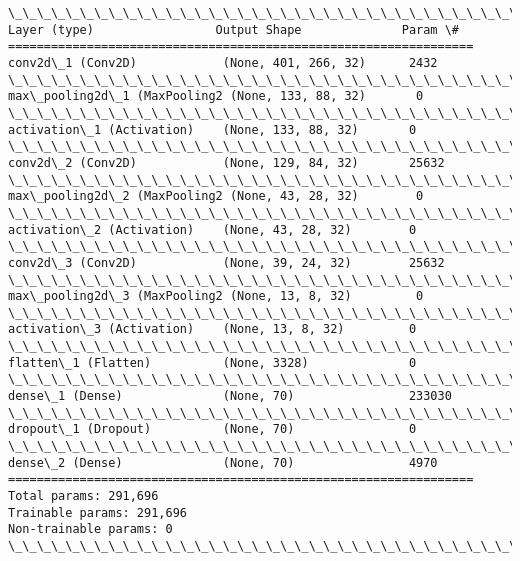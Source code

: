 \documentclass[11pt]{article}
\begin{document}
    \begin{Verbatim}[commandchars=\\\{\}]
\_\_\_\_\_\_\_\_\_\_\_\_\_\_\_\_\_\_\_\_\_\_\_\_\_\_\_\_\_\_\_\_\_\_\_\_\_\_\_\_\_\_\_\_\_\_\_\_\_\_\_\_\_\_\_\_\_\_\_\_\_\_\_\_\_
Layer (type)                 Output Shape              Param \#   
=================================================================
conv2d\_1 (Conv2D)            (None, 401, 266, 32)      2432      
\_\_\_\_\_\_\_\_\_\_\_\_\_\_\_\_\_\_\_\_\_\_\_\_\_\_\_\_\_\_\_\_\_\_\_\_\_\_\_\_\_\_\_\_\_\_\_\_\_\_\_\_\_\_\_\_\_\_\_\_\_\_\_\_\_
max\_pooling2d\_1 (MaxPooling2 (None, 133, 88, 32)       0         
\_\_\_\_\_\_\_\_\_\_\_\_\_\_\_\_\_\_\_\_\_\_\_\_\_\_\_\_\_\_\_\_\_\_\_\_\_\_\_\_\_\_\_\_\_\_\_\_\_\_\_\_\_\_\_\_\_\_\_\_\_\_\_\_\_
activation\_1 (Activation)    (None, 133, 88, 32)       0         
\_\_\_\_\_\_\_\_\_\_\_\_\_\_\_\_\_\_\_\_\_\_\_\_\_\_\_\_\_\_\_\_\_\_\_\_\_\_\_\_\_\_\_\_\_\_\_\_\_\_\_\_\_\_\_\_\_\_\_\_\_\_\_\_\_
conv2d\_2 (Conv2D)            (None, 129, 84, 32)       25632     
\_\_\_\_\_\_\_\_\_\_\_\_\_\_\_\_\_\_\_\_\_\_\_\_\_\_\_\_\_\_\_\_\_\_\_\_\_\_\_\_\_\_\_\_\_\_\_\_\_\_\_\_\_\_\_\_\_\_\_\_\_\_\_\_\_
max\_pooling2d\_2 (MaxPooling2 (None, 43, 28, 32)        0         
\_\_\_\_\_\_\_\_\_\_\_\_\_\_\_\_\_\_\_\_\_\_\_\_\_\_\_\_\_\_\_\_\_\_\_\_\_\_\_\_\_\_\_\_\_\_\_\_\_\_\_\_\_\_\_\_\_\_\_\_\_\_\_\_\_
activation\_2 (Activation)    (None, 43, 28, 32)        0         
\_\_\_\_\_\_\_\_\_\_\_\_\_\_\_\_\_\_\_\_\_\_\_\_\_\_\_\_\_\_\_\_\_\_\_\_\_\_\_\_\_\_\_\_\_\_\_\_\_\_\_\_\_\_\_\_\_\_\_\_\_\_\_\_\_
conv2d\_3 (Conv2D)            (None, 39, 24, 32)        25632     
\_\_\_\_\_\_\_\_\_\_\_\_\_\_\_\_\_\_\_\_\_\_\_\_\_\_\_\_\_\_\_\_\_\_\_\_\_\_\_\_\_\_\_\_\_\_\_\_\_\_\_\_\_\_\_\_\_\_\_\_\_\_\_\_\_
max\_pooling2d\_3 (MaxPooling2 (None, 13, 8, 32)         0         
\_\_\_\_\_\_\_\_\_\_\_\_\_\_\_\_\_\_\_\_\_\_\_\_\_\_\_\_\_\_\_\_\_\_\_\_\_\_\_\_\_\_\_\_\_\_\_\_\_\_\_\_\_\_\_\_\_\_\_\_\_\_\_\_\_
activation\_3 (Activation)    (None, 13, 8, 32)         0         
\_\_\_\_\_\_\_\_\_\_\_\_\_\_\_\_\_\_\_\_\_\_\_\_\_\_\_\_\_\_\_\_\_\_\_\_\_\_\_\_\_\_\_\_\_\_\_\_\_\_\_\_\_\_\_\_\_\_\_\_\_\_\_\_\_
flatten\_1 (Flatten)          (None, 3328)              0         
\_\_\_\_\_\_\_\_\_\_\_\_\_\_\_\_\_\_\_\_\_\_\_\_\_\_\_\_\_\_\_\_\_\_\_\_\_\_\_\_\_\_\_\_\_\_\_\_\_\_\_\_\_\_\_\_\_\_\_\_\_\_\_\_\_
dense\_1 (Dense)              (None, 70)                233030    
\_\_\_\_\_\_\_\_\_\_\_\_\_\_\_\_\_\_\_\_\_\_\_\_\_\_\_\_\_\_\_\_\_\_\_\_\_\_\_\_\_\_\_\_\_\_\_\_\_\_\_\_\_\_\_\_\_\_\_\_\_\_\_\_\_
dropout\_1 (Dropout)          (None, 70)                0         
\_\_\_\_\_\_\_\_\_\_\_\_\_\_\_\_\_\_\_\_\_\_\_\_\_\_\_\_\_\_\_\_\_\_\_\_\_\_\_\_\_\_\_\_\_\_\_\_\_\_\_\_\_\_\_\_\_\_\_\_\_\_\_\_\_
dense\_2 (Dense)              (None, 70)                4970      
=================================================================
Total params: 291,696
Trainable params: 291,696
Non-trainable params: 0
\_\_\_\_\_\_\_\_\_\_\_\_\_\_\_\_\_\_\_\_\_\_\_\_\_\_\_\_\_\_\_\_\_\_\_\_\_\_\_\_\_\_\_\_\_\_\_\_\_\_\_\_\_\_\_\_\_\_\_\_\_\_\_\_\_

    \end{Verbatim}
\end{document}
